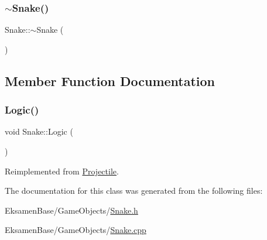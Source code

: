 \mbox{\label{class_snake_a941fbaad96ee33ca3a7c30c28ca44ef8}} 
\subsubsection{\texorpdfstring{$\sim$\+Snake()}{~Snake()}}
{\footnotesize\ttfamily Snake\+::$\sim$\+Snake (\begin{DoxyParamCaption}{ }\end{DoxyParamCaption})}



\subsection{Member Function Documentation}
\mbox{\label{class_snake_a1f01e21a73734f9c0d701ec02a9d2e41}} 
\subsubsection{\texorpdfstring{Logic()}{Logic()}}
{\footnotesize\ttfamily void Snake\+::\+Logic (\begin{DoxyParamCaption}{ }\end{DoxyParamCaption})\hspace{0.3cm}{\ttfamily [virtual]}}



Reimplemented from \mbox{\hyperlink{class_projectile_a871e265207d2bf2d5180152a7acf2d40}{Projectile}}.



The documentation for this class was generated from the following files\+:\begin{DoxyCompactItemize}
\item 
Eksamen\+Base/\+Game\+Objects/\mbox{\hyperlink{_snake_8h}{Snake.\+h}}\item 
Eksamen\+Base/\+Game\+Objects/\mbox{\hyperlink{_snake_8cpp}{Snake.\+cpp}}\end{DoxyCompactItemize}

